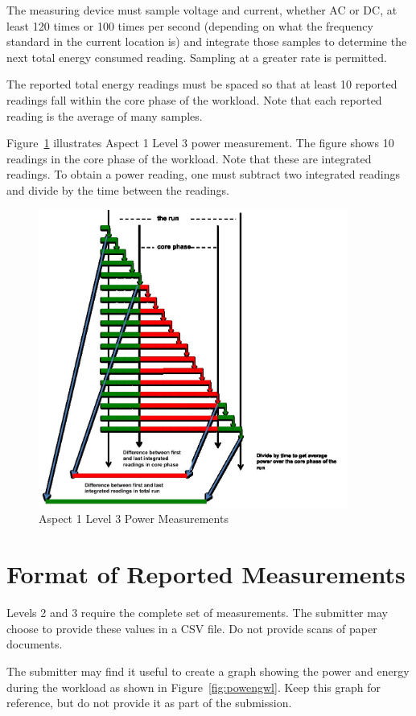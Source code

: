 \noindent
The measuring device must sample voltage and current, whether AC or DC, at least 120 times or 100 times per second (depending on what the frequency standard in the current location is) and integrate those samples to determine the next total energy consumed reading.  Sampling at a greater rate is permitted. 
\wl

\noindent
The reported total energy readings must be spaced so that at least 10 reported readings fall within the core phase of the workload. Note that each reported reading is the average of many samples.
\wl


\noindent
Figure~\ref{fig:a1l3pm} illustrates Aspect 1 Level 3 power measurement. The figure shows 10 readings in the core phase of the workload. Note that these are integrated readings.  To obtain a power reading, one must subtract two integrated readings and divide by the time between the readings.

\begin{figure}
\centering
\includegraphics[width=4in]{fig3-5}
\caption{Aspect 1 Level 3 Power Measurements}
\label{fig:a1l3pm}
\end{figure}

\section{Format of Reported Measurements}
\label{sec:FoRM}
\noindent
Levels 2 and 3 require the complete set of measurements. The submitter may choose to provide these values in a CSV file. Do not provide scans of paper documents.
\wl

\noindent
The submitter may find it useful to create a graph showing the power and energy during the workload as shown in Figure~\ref{fig:powengwl}. Keep this graph for reference, but do not provide it as part of the submission.



